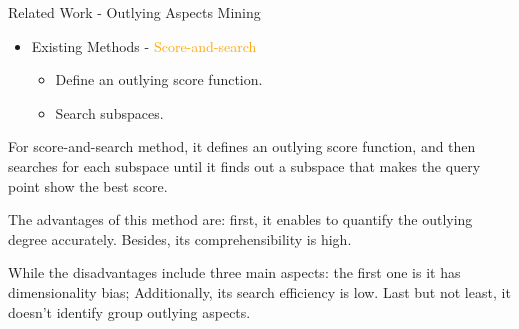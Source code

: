 \documentclass[
 size=14pt,
 paper=smartboard,  %
 mode=present, 		%
 display=slides, 	%
 style=tuliplab,  	%
 pauseslide,
 fleqn,leqno]{powerdot}
\begin{document}
\begin{slide}[toc=,bm=]{Related Work - Outlying Aspects Mining}

\begin{itemize}
\item
Existing Methods - \textcolor{orange} {Score-and-search}

\begin{itemize}
\item
Define an outlying score function.

\item
Search subspaces.
\end{itemize}
\bigskip
{}
\end{itemize}

\begin{note}
For score-and-search method,
it defines an outlying score function,
and then searches for each subspace until it finds out a subspace that
makes the query point show the best score.

The advantages of this method are:
first, it enables to quantify the outlying degree accurately.
Besides, its comprehensibility is high.

While the disadvantages include three main aspects:
the first one is it has dimensionality bias;
Additionally, its search efficiency is low.
Last but not least, it doesn't identify group outlying aspects.
\end{note}

\end{slide}
\end{document}
